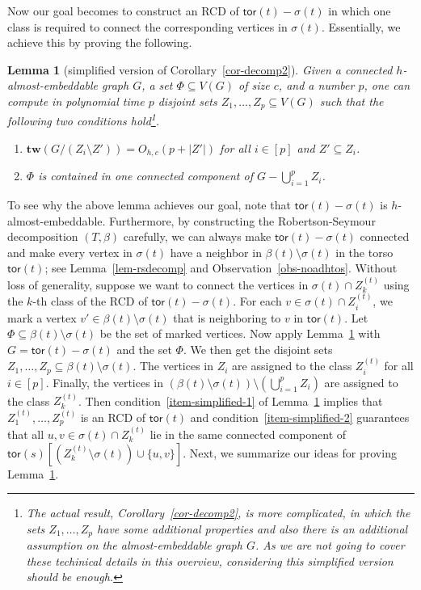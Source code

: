 \documentclass[a4paper,11pt]{article}
\newtheorem{lemma}{Lemma}
\numberwithin{lemma}{section}
\newcommand{\tw}{\mathbf{tw}}
\newcommand{\tor}{\mathsf{tor}}
\begin{document}
Now our goal becomes to construct an RCD of $\tor(t) - \sigma(t)$ in which one class is required to connect the corresponding vertices in $\sigma(t)$.
Essentially, we achieve this by proving the following.

\begin{lemma}[simplified version of Corollary~\ref{cor-decomp2}]
 \label{lem-simplified}
 Given a connected $h$-almost-embeddable graph $G$, a set $\varPhi \subseteq V(G)$ of size $c$, and a number $p$, one can compute in polynomial time $p$ disjoint sets $Z_1,\dots,Z_p \subseteq V(G)$ such that the following two conditions hold\footnote{The actual result, Corollary~\ref{cor-decomp2}, is more complicated, in which the sets $Z_1,\dots,Z_p$ have some additional properties and also there is an additional assumption on the almost-embeddable graph $G$. As we are not going to cover these techinical details in this overview, considering this simplified version should be enough.}.
 \begin{enumerate}[label = (\arabic*)]
  \item\label{item-simplified-1} $\tw(G/(Z_i \setminus Z')) = O_{h,c}(p+|Z'|)$ for all $i \in [p]$ and $Z' \subseteq Z_i$.
  \item\label{item-simplified-2} $\varPhi$ is contained in one connected component of $G - \bigcup_{i=1}^p Z_i$.
 \end{enumerate}
\end{lemma}

To see why the above lemma achieves our goal, note that $\tor(t) - \sigma(t)$ is $h$-almost-embeddable.
Furthermore, by constructing the Robertson-Seymour decomposition $(T,\beta)$ carefully, we can always make $\tor(t) - \sigma(t)$ connected and make every vertex in $\sigma(t)$ have a neighbor in $\beta(t) \setminus \sigma(t)$ in the torso $\tor(t)$; see Lemma~\ref{lem-rsdecomp} and Observation~\ref{obs-noadhtos}.
Without loss of generality, suppose we want to connect the vertices in $\sigma(t) \cap Z_k^{(t)}$ using the $k$-th class of the RCD of $\tor(t) - \sigma(t)$.
For each $v \in \sigma(t) \cap Z_i^{(t)}$, we mark a vertex $v' \in \beta(t) \setminus \sigma(t)$ that is neighboring to $v$ in $\tor(t)$.
Let $\varPhi \subseteq \beta(t) \setminus \sigma(t)$ be the set of marked vertices.
Now apply Lemma~\ref{lem-simplified} with $G = \tor(t) - \sigma(t)$ and the set $\varPhi$.
We then get the disjoint sets $Z_1,\dots,Z_p \subseteq \beta(t) \setminus \sigma(t)$.
The vertices in $Z_i$ are assigned to the class $Z_i^{(t)}$ for all $i \in [p]$.
Finally, the vertices in $(\beta(t) \setminus \sigma(t)) \setminus (\bigcup_{i=1}^p Z_i)$ are assigned to the class $Z_k^{(t)}$.
Then condition~\ref{item-simplified-1} of Lemma~\ref{lem-simplified} implies that $Z_1^{(t)},\dots,Z_p^{(t)}$ is an RCD of $\tor(t)$ and condition~\ref{item-simplified-2} guarantees that all $u,v \in \sigma(t) \cap Z_k^{(t)}$ lie in the same connected component of $\tor(s)[(Z_k^{(t)} \setminus \sigma(t)) \cup \{u,v\}]$.
Next, we summarize our ideas for proving Lemma~\ref{lem-simplified}.
\end{document}
